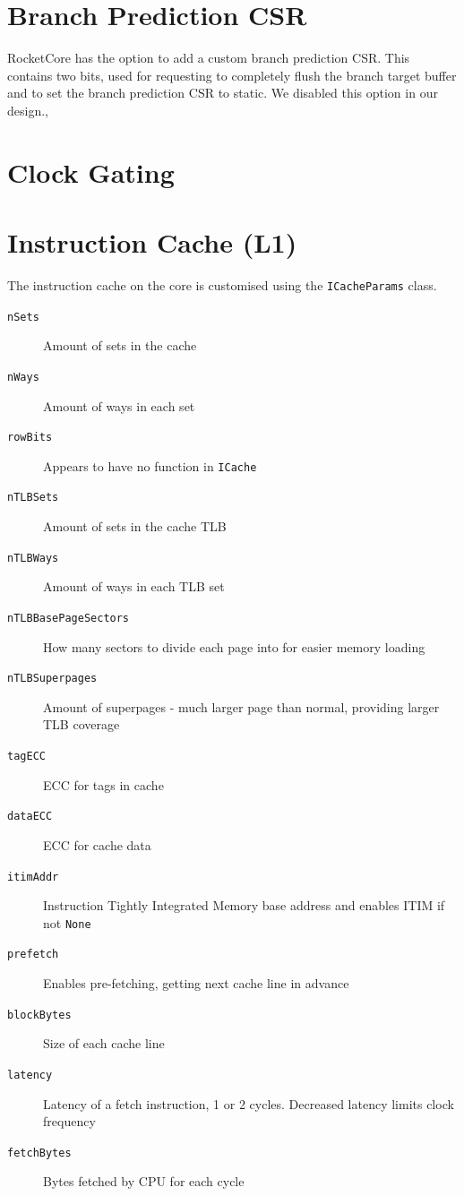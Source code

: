 \section{Branch Prediction CSR}
RocketCore has the option to add a custom branch prediction CSR. This contains two bits, used for requesting to completely flush the branch target buffer and to set the branch prediction CSR to static. We disabled this option in our design.,

\section{Clock Gating} %

\section{Instruction Cache (L1)}
The instruction cache on the core is customised using the \texttt{ICacheParams} class.

\begin{description}
    \item[\texttt{nSets}] Amount of sets in the cache
    \item[\texttt{nWays}] Amount of ways in each set
    \item[\texttt{rowBits}] Appears to have no function in \texttt{ICache}
    \item[\texttt{nTLBSets}] Amount of sets in the cache TLB
    \item[\texttt{nTLBWays}] Amount of ways in each TLB set
    \item[\texttt{nTLBBasePageSectors}] How many sectors to divide each page into for easier memory loading
    \item[\texttt{nTLBSuperpages}] Amount of superpages - much larger page than normal, providing larger TLB coverage
    \item[\texttt{tagECC}] ECC for tags in cache
    \item[\texttt{dataECC}] ECC for cache data
    \item[\texttt{itimAddr}] Instruction Tightly Integrated Memory base address and enables ITIM if not \texttt{None}
    \item[\texttt{prefetch}] Enables pre-fetching, getting next cache line in advance
    \item[\texttt{blockBytes}] Size of each cache line
    \item[\texttt{latency}] Latency of a fetch instruction, 1 or 2 cycles. Decreased latency limits clock frequency
    \item[\texttt{fetchBytes}] Bytes fetched by CPU for each cycle
\end{description}

